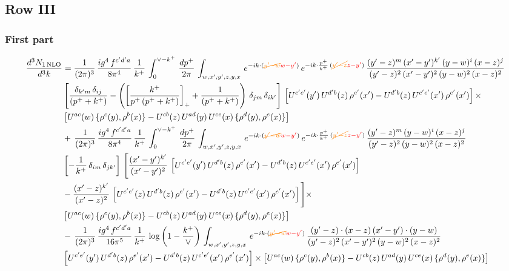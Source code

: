 \documentclass[9pt]{article}
\numberwithin{equation}{section}
\begin{document}
 \subsection{Row III}
\subsubsection{First part}
\begin{align}
     \frac{d^{3}N_{1\,\rm NLO}}{d^{3}k} & =  \frac{1}{(2\pi)^{3}}\, \frac{ig^{4}\,f^{c'd'a}}{8\pi^{4}}\, \frac{1}{k^{+}}\,\int_{0}^{\vee-k^{+}}\,  \frac{dp^{+}}{2\pi}\, \int_{w,x',y',z,y,x}\, e^{-ik\cdot ({\color{orange}\cancel{y'-w}}{\color{red}w-y'})}\, e^{-ik\cdot \frac{p^{+}}{k^{+}}\,({\color{orange}\cancel{y'-z}}{\color{red}z-y'})}\,\frac{(y'-z)^{m}\,(x'-y')^{k'}\,(y-w)^{i}\,(x-z)^{j}}{(y'-z)^{2}\,(x'-y')^{2}\,(y-w)^{2}\,(x-z)^{2}}\notag \\ & \left[\frac{\delta_{k'm}\,\delta_{ij}}{(p^{+}+k^{+})}-\left(\left[\frac{k^{+}}{p^{+}\,(p^{+}+k^{+})}\right]_{+}+\frac{1}{(p^{+}+k^{+})}\right)\,\delta_{jm}\,\delta_{ik'}\right]\, \left[U^{c'e'}(y')\,U^{d'b}(z)\,\rho^{e'}(x')-U^{d'b}(z)\,U^{c'e'}(x')\,\rho^{e'}(x')\right]\times\notag \\ &  \left[U^{ac}(w)\, \{\rho^{c}(y),\rho^{b}(x)\}-U^{cb}(z)\,U^{ad}(y)\,U^{ce}(x)\,\{\rho^{d}(y),\rho^{e}(x)\}\right] \notag \\
&  +\,\frac{1}{(2\pi)^{3}}\, \frac{ig^{4}\,f^{c'd'a}}{8\pi^{4}}\, \frac{1}{k^{+}}\,\int_{0}^{\vee-k^{+}}\,  \frac{dp^{+}}{2\pi}\, \int_{w,x',y',z,y,x}\, e^{-ik\cdot ({\color{orange}\cancel{y'-w}}{\color{red}w-y'})}\, e^{-ik\cdot \frac{p^{+}}{k^{+}}\,({\color{orange}\cancel{y'-z}}{\color{red}z-y'})}\,\frac{(y'-z)^{m}\,(y-w)^{i}\,(x-z)^{j}}{(y'-z)^{2}\,(y-w)^{2}\,(x-z)^{2}}\notag \\ &   \left[-\frac{1}{k^{+}}\, \delta_{im}\, \delta_{jk'}\right]\, \Bigg[\frac{(x'-y')^{k'}}{(x'-y')^{2}}\,\left[U^{c'e'}(y')\,U^{d'b}(z)\,\rho^{e'}(x')-U^{d'b}(z)\,U^{c'e'}(x')\,\rho^{e'}(x')\right]\notag \\ & -\frac{(x'-z)^{k'}}{(x'-z)^{2}}\,\left[U^{c'e'}(z)\,U^{d'b}(z)\,\rho^{e'}(x')-U^{d'b}(z)\,U^{c'e'}(x')\,\rho^{e'}(x')\right]\Bigg]\times\notag \\ &   \left[U^{ac}(w)\, \{\rho^{c}(y),\rho^{b}(x)\}-U^{cb}(z)\,U^{ad}(y)\,U^{ce}(x)\,\{\rho^{d}(y),\rho^{e}(x)\}\right] \notag \\
& -\,\frac{1}{(2\pi)^{3}}\, \frac{ig^{4}\,f^{c'd'a}}{16\pi^{5}}\, \frac{1}{k^{+}}\,\log{\left(1-\frac{k^{+}}{\vee}\right)}\, \int_{w,x',y',z,y,x}\, e^{-ik\cdot ({\color{orange}\cancel{y'-w}}{\color{red}w-y'})}\,\frac{(y'-z)\cdot (x-z)\,(x'-y')\cdot (y-w)}{(y'-z)^{2}\,(x'-y')^{2}\,(y-w)^{2}\,(x-z)^{2}}\notag \\ &  \left[U^{c'e'}(y')\,U^{d'b}(z)\,\rho^{e'}(x')-U^{d'b}(z)\,U^{c'e'}(x')\,\rho^{e'}(x')\right]\times  \left[U^{ac}(w)\, \{\rho^{c}(y),\rho^{b}(x)\}-U^{cb}(z)\,U^{ad}(y)\,U^{ce}(x)\,\{\rho^{d}(y),\rho^{e}(x)\}\right]

\end{align}
\end{document}
